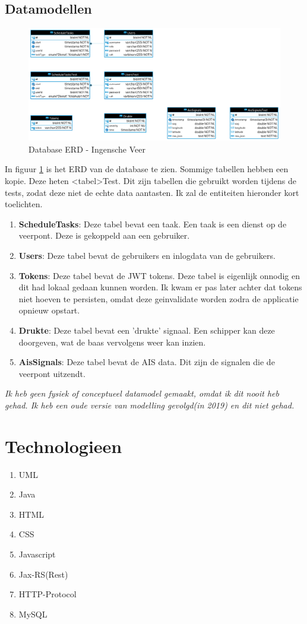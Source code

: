 \documentclass{article}
\begin{document}
\subsection{Datamodellen}
\begin{figure}[H]
    \centering
    \includegraphics[width=1\textwidth]{images/erd.png}
    \caption{Database ERD - Ingensche Veer}
    \label{fig:erd}
\end{figure}
In figuur \ref{fig:erd} is het ERD van de database te zien. Sommige tabellen hebben een kopie. Deze heten <tabel>Test. Dit zijn tabellen die gebruikt worden tijdens de tests, zodat deze niet de echte data aantasten.
Ik zal de entiteiten hieronder kort toelichten.
\begin{enumerate}
    \item \textbf{ScheduleTasks}: Deze tabel bevat een taak. Een taak is een dienst op de veerpont. Deze is gekoppeld aan een gebruiker.
    \item \textbf{Users}: Deze tabel bevat de gebruikers en inlogdata van de gebruikers.
    \item \textbf{Tokens}: Deze tabel bevat de JWT tokens. Deze tabel is eigenlijk onnodig en dit had lokaal gedaan kunnen worden. Ik kwam er pas later achter dat tokens niet hoeven te persisten, omdat deze geinvalidate worden zodra de applicatie opnieuw opstart.
    \item \textbf{Drukte}: Deze tabel bevat een 'drukte' signaal. Een schipper kan deze doorgeven, wat de baas vervolgens weer kan inzien.
    \item \textbf{AisSignals}: Deze tabel bevat de AIS data. Dit zijn de signalen die de veerpont uitzendt.
\end{enumerate}
\textit{Ik heb geen fysiek of conceptueel datamodel gemaakt, omdat ik dit nooit heb gehad. Ik heb een oude versie van modelling gevolgd(in 2019) en dit niet gehad.}

\section{Technologieen}
\begin{enumerate}
    \item UML
    \item Java 
    \item HTML 
    \item CSS 
    \item Javascript 
    \item Jax-RS(Rest)
    \item HTTP-Protocol 
    \item MySQL
\end{enumerate}
\end{document}
